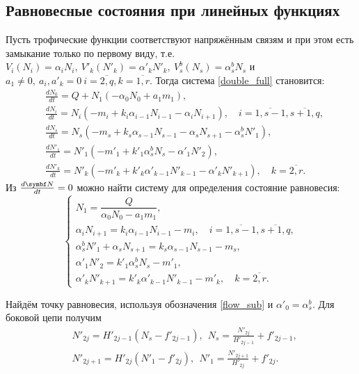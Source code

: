 \subsection{Равновесные состояния при линейных функциях}
Пусть трофические функции соответствуют напряжённым связям и при этом есть замыкание только по первому виду, т.е. \(V_i(N_i) = \alpha_i N_i, ~ V'_k(N'_k) = \alpha'_k N'_k, ~ V^b_s(N_s) = \alpha^b_s N_s\) и \( a_1 \neq 0, ~ a_i, a'_k = 0 ~ i=\overline{2,q}, k=\overline{1,r}\). Тогда система \eqref{double_full} становится:
\begin{equation} \label{double_lin}
    \begin{split}
        & \frac{d N_0}{dt} = Q + N_1 ( -\alpha_0 N_0 + a_1 m_1 ), \\
        & \frac{d N_i}{dt} = N_i (-m_i + k_i \alpha_{i-1} N_{i-1} - \alpha_i N_{i+1}), \quad i=\overline{1,s-1},  \overline{s+1,q}, \\
        & \frac{d N_s}{dt} = N_s ( -m_s + k_s \alpha_{s-1} N_{s-1} - \alpha_s N_{s+1} - \alpha_s^b N'_1 ), \\
        & \frac{d N'_1}{dt} = N'_1 ( -m'_1 + k'_1 \alpha_s^b N_s - \alpha'_1 N'_{2} ), \\
        & \frac{d N'_k}{dt} = N'_k ( -m'_k + k'_k \alpha'_{k-1} N'_{k-1} - \alpha'_k N'_{k+1} ), \quad k=\overline{2,r}.
    \end{split}
\end{equation}
Из \( \frac{d \mb{N}}{dt} = 0 \) можно найти систему для определения состояние равновесия:
\begin{equation} \label{double_stab_system}
    \begin{cases}
        N_1 = \dfrac{Q}{ \alpha_0 N_0 - a_1 m_1 }, \\
        \alpha_i N_{i+1} = k_i \alpha_{i-1} N_{i-1} -m_i , \quad i=\overline{1,s-1},  \overline{s+1,q}, \\
        \alpha_s^b N'_1 + \alpha_s N_{s+1} = k_s \alpha_{s-1} N_{s-1} -m_s, \\
        \alpha'_1 N'_{2} = k'_1 \alpha_s^b N_s -m'_1, \\
        \alpha'_k N'_{k+1} = k'_k \alpha'_{k-1} N'_{k-1} -m'_k, \quad k=\overline{2,r}.
    \end{cases}
\end{equation}

Найдём точку равновесия, используя обозначения \eqref{flow_sub} и \(\alpha'_0 = \alpha^b_s\). Для боковой цепи получим
\begin{equation}
    \begin{split}
        & N'_{2j} = H'_{2j-1} (N_s - f'_{2j-1}), ~~ N_s = \frac{N'_{2j}}{H'_{2j-1}} + f'_{2j-1}, \\
        & N'_{2j+1} = H'_{2j} (N'_1 - f'_{2j}), ~~ N'_1 = \frac{N'_{2j+1}}{H'_{2j}} + f'_{2j}.
    \end{split}
\end{equation}

